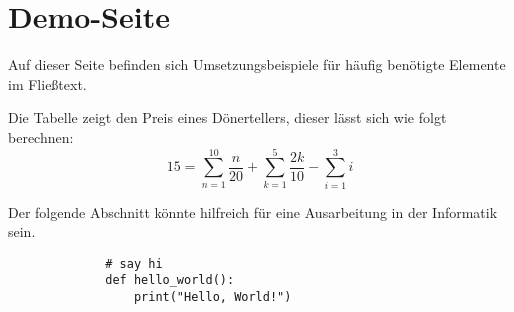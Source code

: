 \section{Demo-Seite}
Auf dieser Seite befinden sich Umsetzungsbeispiele für häufig benötigte Elemente im Fließtext.\\


Die Tabelle zeigt den Preis eines Dönertellers, dieser lässt sich wie folgt berechnen:
\begin{equation}%
    15 = \sum_{n=1}^{10} \frac{n}{20} + \sum_{k=1}^{5} \frac{2k}{10} - \sum_{i=1}^{3} i
\end{equation}

\newpage
Der folgende Abschnitt könnte hilfreich für eine Ausarbeitung in der Informatik sein.
\begin{figure}[H] %
    \begin{lstlisting}
        # say hi
        def hello_world():
            print("Hello, World!")
    \end{lstlisting}
    \label{fig:meincode}%
\end{figure}

